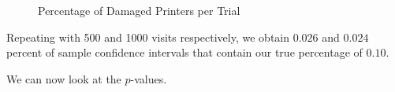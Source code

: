 \documentclass[10pt]{report}\usepackage[]{graphicx}\usepackage[]{xcolor}
\newenvironment{knitrout}{}{} %
\begin{document}
\begin{easylist}[enumerate]
\begin{knitrout}
\begin{figure}[H]
{{}

}
\caption[Percentage of Damaged Printers per Trial]{Percentage of Damaged Printers per Trial\label{fig:multivisits_new}}
\end{figure}


\end{knitrout}


        Repeating with 500 and 1000 visits respectively, we obtain $0.026$ and
        $0.024$ percent of sample confidence intervals that contain our true percentage of
        $0.10$.\newline

        We can now look at the $p$-values.


\end{easylist}
\end{document}
